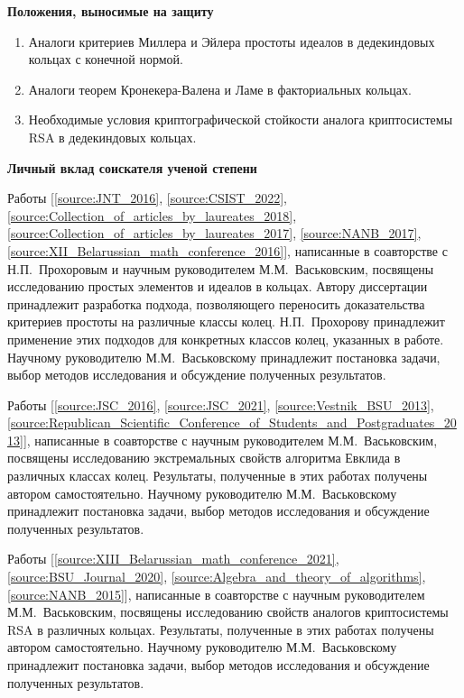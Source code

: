 \documentclass[_00_dissertation.tex]{subfiles}
\begin{document}
\pagebreak
\begin{center}
\textbf{Положения, выносимые на защиту}
\end{center}

\begin{enumerate}
    \item Аналоги критериев Миллера и Эйлера простоты идеалов в дедекиндовых кольцах с конечной нормой.
    
    \item Аналоги теорем Кронекера-Валена и Ламе в факториальных кольцах.
    
    \item Необходимые условия криптографической стойкости аналога криптосистемы RSA в дедекиндовых кольцах.
\end{enumerate}

\begin{center}
\textbf{Личный вклад соискателя ученой степени}
\end{center}

Работы [\ref{source:JNT_2016}, \ref{source:CSIST_2022}, \ref{source:Collection_of_articles_by_laureates_2018}, \ref{source:Collection_of_articles_by_laureates_2017}, \ref{source:NANB_2017}, \ref{source:XII_Belarussian_math_conference_2016}], написанные в соавторстве с Н.П.~Прохоровым и научным руководителем М.М.~Васьковским, посвящены исследованию простых элементов и идеалов в кольцах.
Автору диссертации принадлежит разработка подхода, позволяющего переносить доказательства критериев простоты на различные классы колец.
Н.П.~Прохорову принадлежит применение этих подходов для конкретных классов колец, указанных в работе.
Научному руководителю М.М.~Васьковскому принадлежит постановка задачи, выбор методов исследования и обсуждение полученных результатов.

Работы [\ref{source:JSC_2016}, \ref{source:JSC_2021}, \ref{source:Vestnik_BSU_2013}, \ref{source:Republican_Scientific_Conference_of_Students_and_Postgraduates_2013}], написанные в соавторстве с научным руководителем М.М.~Васьковским, посвящены исследованию экстремальных свойств алгоритма Евклида в различных  классах колец.
Результаты, полученные  в этих работах получены  автором самостоятельно.
Научному руководителю М.М.~Васьковскому принадлежит постановка задачи, выбор методов исследования и обсуждение полученных результатов.

Работы [\ref{source:XIII_Belarussian_math_conference_2021}, \ref{source:BSU_Journal_2020}, \ref{source:Algebra_and_theory_of_algorithms}, \ref{source:NANB_2015}], написанные в соавторстве с научным руководителем М.М.~Васьковским, посвящены исследованию свойств аналогов криптосистемы RSA в различных кольцах.
Результаты, полученные  в этих работах получены  автором самостоятельно.
Научному руководителю М.М.~Васьковскому принадлежит постановка задачи, выбор методов исследования и обсуждение полученных результатов.
\end{document}
